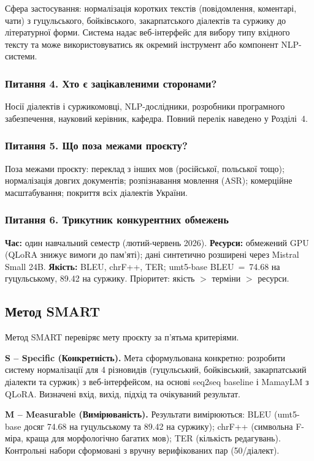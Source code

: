 \documentclass[14pt]{extarticle}
\begin{document}
Сфера застосування: нормалізація коротких текстів (повідомлення, коментарі, чати) з гуцульського, бойківського, закарпатського діалектів та суржику до літературної форми. Система надає веб-інтерфейс для вибору типу вхідного тексту та може використовуватись як окремий інструмент або компонент NLP-системи.

\subsubsection*{Питання 4. Хто є зацікавленими сторонами?}

Носії діалектів і суржикомовці, NLP-дослідники, розробники програмного забезпечення, науковий керівник, кафедра. Повний перелік наведено у Розділі~4.

\subsubsection*{Питання 5. Що поза межами проєкту?}

Поза межами проєкту: переклад з інших мов (російської, польської тощо); нормалізація довгих документів; розпізнавання мовлення (ASR); комерційне масштабування; покриття всіх діалектів України.

\subsubsection*{Питання 6. Трикутник конкурентних обмежень}

\textbf{Час:} один навчальний семестр (лютий-червень 2026). \textbf{Ресурси:} обмежений GPU (QLoRA знижує вимоги до пам'яті); дані синтетично розширені через Mistral Small 24B. \textbf{Якість:} BLEU, chrF++, TER; umt5-base BLEU~=~74.68 на гуцульському, 89.42 на суржику. Пріоритет: якість $>$ терміни $>$ ресурси.

\subsection{Метод SMART}

Метод SMART перевіряє мету проєкту за п'ятьма критеріями.

\textbf{S -- Specific (Конкретність).} Мета сформульована конкретно: розробити систему нормалізації для 4 різновидів (гуцульський, бойківський, закарпатський діалекти та суржик) з веб-інтерфейсом, на основі seq2seq baseline і MamayLM з QLoRA. Визначені вхід, вихід, підхід та очікуваний результат.

\textbf{M -- Measurable (Вимірюваність).} Результати вимірюються: BLEU (umt5-base досяг 74.68 на гуцульському та 89.42 на суржику); chrF++ (символьна F-міра, краща для морфологічно багатих мов); TER (кількість редагувань). Контрольні набори сформовані з вручну верифікованих пар (50/діалект).
\end{document}

